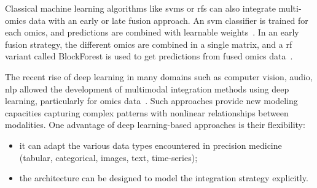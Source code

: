 \documentclass[../main.tex]{subfiles}
\begin{document}
		Classical machine learning algorithms like \glspl{svm} or \glspl{rf} can also integrate multi-omics data with an early or late fusion approach.
		An \gls{svm} classifier is trained for each omics, and predictions are combined with learnable weights~\cite{CarrilloPerez2022}.
		In an early fusion strategy, the different omics are combined in a single matrix, and a \gls{rf} variant called BlockForest is used to get predictions from fused omics data~\cite{Hornung2019}.

		The recent rise of deep learning in many domains such as computer vision, audio, \gls{nlp} allowed the development of multimodal integration methods using deep learning, particularly for omics data~\cite{Kang2021}.
		Such approaches provide new modeling capacities capturing complex patterns with nonlinear relationships between modalities.
		One advantage of deep learning-based approaches is their flexibility:
		\begin{itemize}[nosep]
			\item it can adapt the various data types encountered in precision medicine (tabular, categorical, images, text, time-series);
			\item the architecture can be designed to model the integration strategy explicitly.
		\end{itemize}

\end{document}
